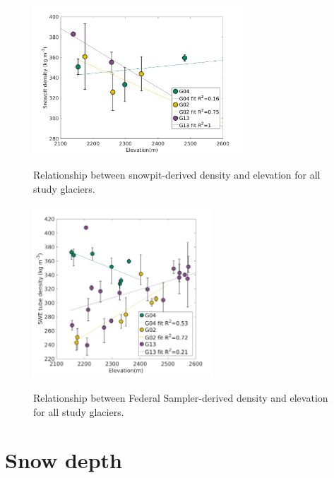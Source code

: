 \documentclass[12pt]{article}
\begin{document}
\begin{figure}[H]
	\centering
	\includegraphics[width = 0.7\textwidth]{ElevationVsSnowpit_all.png}\\
	\caption{Relationship between snowpit-derived density and elevation for all study glaciers.}
	\label{fig:elev_snowpit}
\end{figure}


\begin{figure}[H]
	\centering
	\includegraphics[width = 0.6\textwidth]{ElevationVsSWEtube_all.png}\\
	\caption{Relationship between Federal Sampler-derived density and elevation for all study glaciers.}
	\label{fig:elev_tube}
\end{figure}


\pagebreak

\section{Snow depth}
\end{document}
